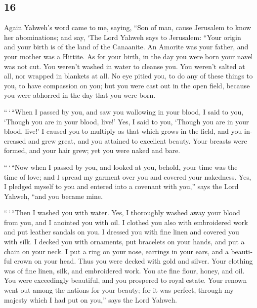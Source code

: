 \begin{paracol}{2}
\switchcolumn
\begin{otherlanguage}{english}

\hypertarget{section-31}{%
\section{16}\label{section-31}}

 Again Yahweh's word came to me, saying, 
``Son of man, cause Jerusalem to know her abominations; 
and say, `The Lord Yahweh says to Jerusalem: ``Your origin and your
birth is of the land of the Canaanite. An Amorite was your father, and
your mother was a Hittite.  As for your birth, in the day
you were born your navel was not cut. You weren't washed in water to
cleanse you. You weren't salted at all, nor wrapped in blankets at all.
 No eye pitied you, to do any of these things to you, to
have compassion on you; but you were cast out in the open field, because
you were abhorred in the day that you were born.

 ``\,`\,``When I passed by you, and saw you wallowing in
your blood, I said to you, `Though you are in your blood, live!' Yes, I
said to you, `Though you are in your blood, live!'  I
caused you to multiply as that which grows in the field, and you
increased and grew great, and you attained to excellent beauty. Your
breasts were formed, and your hair grew; yet you were naked and bare.

 ``\,`\,``Now when I passed by you, and looked at you,
behold, your time was the time of love; and I spread my garment over you
and covered your nakedness. Yes, I pledged myself to you and entered
into a covenant with you,'' says the Lord Yahweh, ``and you became mine.

 ``\,`\,``Then I washed you with water. Yes, I thoroughly
washed away your blood from you, and I anointed you with oil.
 I clothed you also with embroidered work and put leather
sandals on you. I dressed you with fine linen and covered you with silk.
 I decked you with ornaments, put bracelets on your
hands, and put a chain on your neck.  I put a ring on
your nose, earrings in your ears, and a beautiful crown on your head.
 Thus you were decked with gold and silver. Your clothing
was of fine linen, silk, and embroidered work. You ate fine flour,
honey, and oil. You were exceedingly beautiful, and you prospered to
royal estate.  Your renown went out among the nations for
your beauty; for it was perfect, through my majesty which I had put on
you,'' says the Lord Yahweh.


\end{otherlanguage}
\end{paracol}
